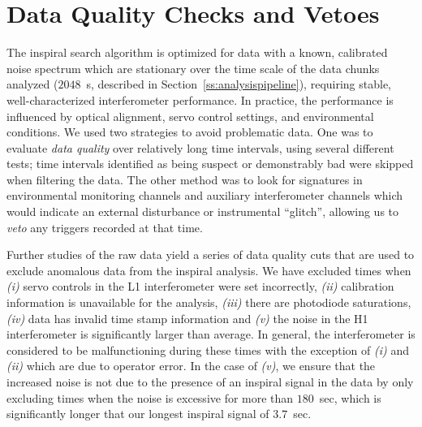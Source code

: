 \section{Data Quality Checks and Vetoes}
\label{s:dq}

The inspiral search algorithm is optimized for data with a known,
calibrated noise spectrum which are stationary over the time scale of
the data chunks analyzed ($2048$~s, described in
Section~\ref{ss:analysispipeline}), requiring stable,
well-characterized interferometer performance.  In practice, the
performance is influenced by optical alignment, servo control
settings, and environmental conditions.  We used two strategies to
avoid problematic data.  One was to evaluate {\it data quality} over
relatively long time intervals, using several different tests; time
intervals identified as being suspect or demonstrably bad were skipped
when filtering the data.  The other method was to look for signatures
in environmental monitoring channels and auxiliary interferometer
channels which would indicate an external disturbance or instrumental
``glitch'', allowing us to {\it veto} any triggers recorded at that
time.

Further studies of the raw data yield a series of data quality cuts
that are used to exclude anomalous data from the inspiral
analysis\cite{gwdawveto}. We have excluded times when \emph{(i)} servo
controls in the L1 interferometer were set incorrectly, \emph{(ii)}
calibration information is unavailable for the analysis, \emph{(iii)} there
are photodiode saturations, \emph{(iv)} data has invalid time stamp
information and \emph{(v)} the noise in the H1 interferometer is significantly
larger than average. In general, the interferometer is considered to be
malfunctioning during these times with the exception of \emph{(i)} and
\emph{(ii)} which are due to operator error. In the case of \emph{(v)}, we
ensure that the increased noise is not due to the presence of an inspiral
signal in the data by only excluding times when the noise is excessive for
more than $180$~sec, which is significantly longer that our longest inspiral
signal of $3.7$~sec.

